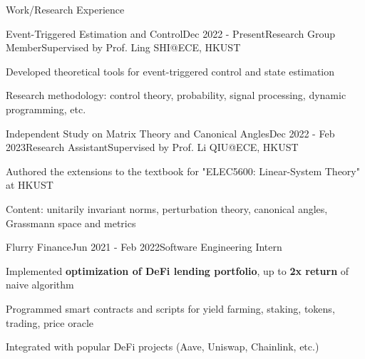 \documentclass{resume}
\begin{document}
\begin{rSection}{Work/Research Experience}
    
    \begin{rSubsection}{Event-Triggered Estimation and Control}{Dec 2022 - Present}{Research Group Member}{Supervised by Prof. Ling SHI@ECE, HKUST}
        \item Developed theoretical tools for event-triggered control and state estimation
        \item Research methodology: control theory, probability, signal processing, dynamic programming, etc.
    \end{rSubsection}

    \begin{rSubsection}{Independent Study on Matrix Theory and Canonical Angles}{Dec 2022 - Feb 2023}{Research Assistant}{Supervised by Prof. Li QIU@ECE, HKUST}
        \item Authored the extensions to the textbook for "ELEC5600: Linear-System Theory" at HKUST
        \item Content: unitarily invariant norms, perturbation theory, canonical angles, Grassmann space and metrics
    \end{rSubsection}
    
    \begin{rSubsection}{Flurry Finance}{Jun 2021 - Feb 2022}{Software Engineering Intern}{}
        \item Implemented \textbf{optimization of DeFi lending portfolio}, up to \textbf{2x return} of naive algorithm
        \item Programmed smart contracts and scripts for yield farming, staking, tokens, trading, price oracle
        \item Integrated with popular DeFi projects (Aave, Uniswap, Chainlink, etc.)
    \end{rSubsection}
    
\end{rSection}
\end{document}
